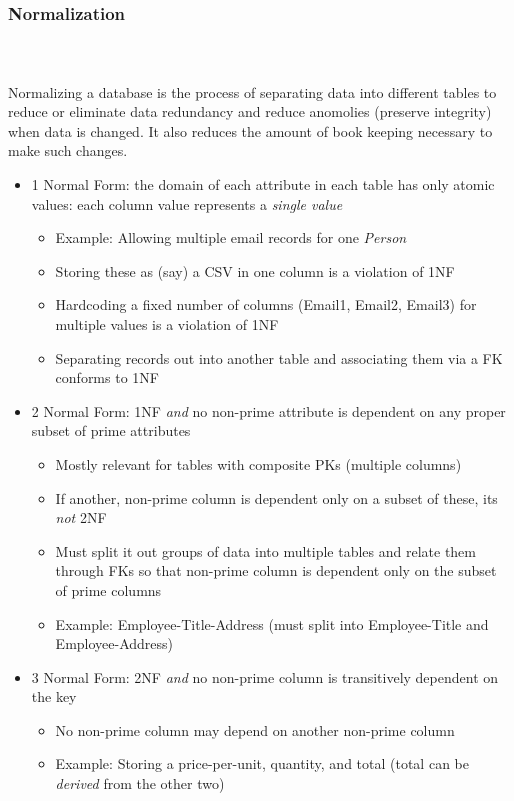 \documentclass{beamer}
\begin{document}
\begin{frame}[allowframebreaks]
  \frametitle{Normalization}
  \framesubtitle{~}

  Normalizing a database is the process of separating data into different tables to 
  reduce or eliminate data redundancy and reduce anomolies (preserve integrity)
  when data is changed.  It also reduces the amount of book keeping necessary
  to make such changes.

  \begin{itemize}
    \item 1 Normal Form: the domain of each attribute in each table has only atomic values: each column value represents a \emph{single value}
    \begin{itemize}
      \item Example: Allowing multiple email records for one \emph{Person}
      \item Storing these as (say) a CSV in one column is a violation of 1NF
      \item Hardcoding a fixed number of columns (Email1, Email2, Email3) for multiple values is a violation of 1NF
      \item Separating records out into another table and associating them via a FK conforms to 1NF
    \end{itemize}
\framebreak
    \item 2 Normal Form: 1NF \emph{and} no non-prime attribute is dependent on any proper subset of prime attributes
    \begin{itemize}
      \item Mostly relevant for tables with composite PKs (multiple columns)
      \item If another, non-prime column is dependent only on a subset of these, its \emph{not} 2NF
      \item Must split it out groups of data into multiple tables and relate them through FKs so that non-prime column is dependent only on the subset of prime columns
      \item Example: Employee-Title-Address (must split into Employee-Title and Employee-Address)
    \end{itemize}
\framebreak
    \item 3 Normal Form: 2NF \emph{and} no non-prime column is transitively dependent on the key
    \begin{itemize}
      \item No non-prime column may depend on another non-prime column
      \item Example: Storing a price-per-unit, quantity, and total (total can be \emph{derived} from the other two)

\end{itemize}
\end{itemize}
\end{frame}
\end{document}
